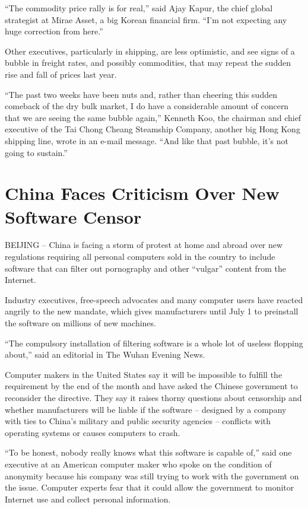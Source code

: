 ﻿\documentclass[12pt,a4paper,onecolumn]{article}
\begin{document}
``The commodity price rally is for real,'' said Ajay Kapur, the chief global strategist at Mirae
Asset, a big Korean financial firm. ``I'm not expecting any huge correction from here.''

Other executives, particularly in shipping, are less optimistic, and see signs of a bubble in
freight rates, and possibly commodities, that may repeat the sudden rise and fall of prices last
year.

``The past two weeks have been nuts and, rather than cheering this sudden comeback of the dry bulk
market, I do have a considerable amount of concern that we are seeing the same bubble again,''
Kenneth Koo, the chairman and chief executive of the Tai Chong Cheang Steamship Company, another big
Hong Kong shipping line, wrote in an e-mail message. ``And like that past bubble, it's not going to
sustain.''

\section{China Faces Criticism Over New Software Censor}

BEIJING -- China is facing a storm of protest at home and abroad over new regulations requiring all
personal computers sold in the country to include software that can filter out pornography and other
``vulgar'' content from the Internet.

Industry executives, free-speech advocates and many computer users have reacted angrily to the new
mandate, which gives manufacturers until July 1 to preinstall the software on millions of new
machines.

``The compulsory installation of filtering software is a whole lot of useless flopping about,'' said
an editorial in The Wuhan Evening News.

Computer makers in the United States say it will be impossible to fulfill the requirement by the end
of the month and have asked the Chinese government to reconsider the directive. They say it raises
thorny questions about censorship and whether manufacturers will be liable if the software --
designed by a company with ties to China's military and public security agencies -- conflicts with
operating systems or causes computers to crash.

``To be honest, nobody really knows what this software is capable of,'' said one executive at an
American computer maker who spoke on the condition of anonymity because his company was still trying
to work with the government on the issue. Computer experts fear that it could allow the government
to monitor Internet use and collect personal information.
\end{document}

